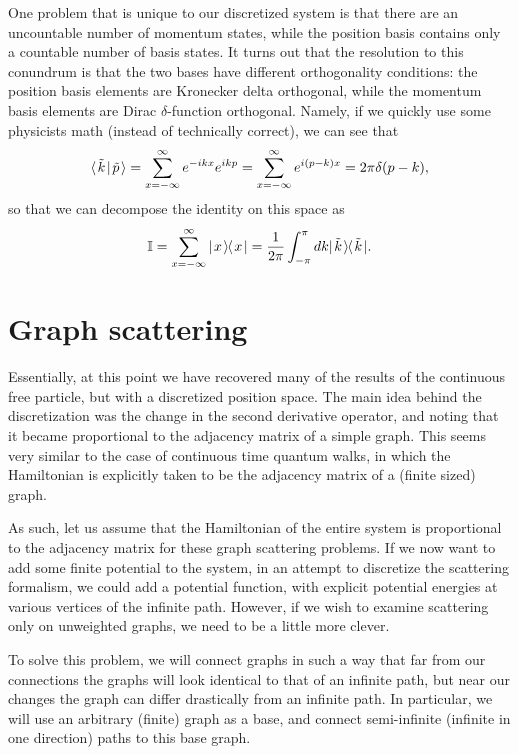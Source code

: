 \documentclass[../thesis-main/thesis-main]{subfiles}
\begin{document}
One problem that is unique to our discretized system is that  there are an uncountable number of momentum states, while the position basis contains only a countable number of basis states.  It turns out that the resolution to this conundrum is that the two bases have different orthogonality conditions: the position basis elements are Kronecker delta orthogonal, while the momentum basis elements are Dirac $\delta$-function orthogonal.  Namely, if we quickly use some physicists math (instead of technically correct), we can see that
\begin{equation}
  \langle\mspace{2mu} \tilde{k} \mspace{2mu} | \mspace{2mu} \tilde{p}\mspace{2mu} \rangle = \sum_{x=-\infty}^\infty e^{- i k x} e^{i k p} = \sum_{x=-\infty}^\infty e^{i (p-k) x} = 2\pi \delta(p-k),
\end{equation}
so that we can decompose the identity on this space as 
\begin{equation}
\mathbb{I} = \sum_{x=-\infty}^\infty |\mspace{2mu} x \mspace{2mu} \rangle\mspace{-2mu}\langle\mspace{2mu} x \mspace{2mu} | = \frac{1}{2\pi} \int_{-\pi}^\pi dk |\mspace{2mu} \tilde{k} \mspace{2mu} \rangle\mspace{-2mu}\langle\mspace{2mu} \tilde{k} \mspace{2mu} |.
\end{equation}


\section{Graph scattering}

Essentially, at this point we have recovered many of the results of the continuous free particle, but with a discretized position space.  The main idea behind the discretization was the change in the second derivative operator, and noting that it became proportional to the adjacency matrix of a simple graph.  This seems very similar to the case of continuous time quantum walks, in which the Hamiltonian is explicitly taken to be the adjacency matrix of a (finite sized) graph. 

As such, let us assume that the Hamiltonian of the entire system is proportional to the adjacency matrix for these graph scattering problems.  If we now want to add some finite potential to the system, in an attempt to discretize the scattering formalism, we could add a potential function, with explicit potential energies at various vertices of the infinite path.  However, if we wish to examine scattering only on unweighted graphs, we need to be a little more clever.  

To solve this problem, we will connect graphs in such a way that far from our connections the graphs will look identical to that of an infinite path, but near our changes the graph can differ drastically from an infinite path.  In particular, we will use an arbitrary (finite) graph as a base, and connect semi-infinite (infinite in one direction) paths to this base graph.
\end{document}
